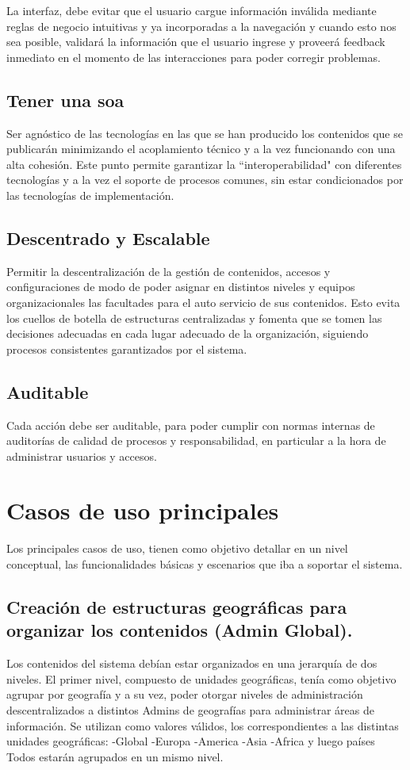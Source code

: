 La interfaz, debe evitar que el usuario cargue información inválida mediante reglas de negocio intuitivas y ya incorporadas a la navegación y cuando esto nos sea posible, validará la información que el usuario ingrese y proveerá feedback inmediato en el momento de las interacciones para poder corregir problemas.

\subsection{Tener una \Gls{soa}}
\label{principios:soa}
Ser agnóstico de las tecnologías en las que se han producido los contenidos que se publicarán minimizando el acoplamiento técnico y a la vez funcionando con una alta cohesión. Este punto permite garantizar la “interoperabilidad" con diferentes tecnologías y a la vez el soporte de procesos comunes, sin estar condicionados por las tecnologías de implementación.

\subsection{Descentrado y Escalable}
\label{principios:federado}
Permitir la descentralización de la gestión de contenidos, accesos y configuraciones de modo de poder asignar en distintos niveles y equipos organizacionales las facultades para el auto servicio de sus contenidos. Esto evita los cuellos de botella de estructuras centralizadas y fomenta que se tomen las decisiones adecuadas en cada lugar adecuado de la organización, siguiendo procesos consistentes garantizados por el sistema.

\subsection{Auditable}
\label{princpipios:auditable}
Cada acción debe ser auditable, para poder cumplir con normas internas de auditorías de calidad de procesos y responsabilidad, en particular a la hora de administrar usuarios y accesos.

\section{Casos de uso principales}
\label{usecases:main}
Los principales casos de uso, tienen como objetivo detallar en un nivel conceptual, las funcionalidades básicas y escenarios que iba a soportar el sistema. 

\subsection{Creación de estructuras geográficas para organizar los contenidos (Admin Global).}
\label{usecases:geolevel1}
Los contenidos del sistema debían estar organizados en una jerarquía de dos niveles. El primer nivel, compuesto de unidades geográficas, tenía como objetivo agrupar por geografía y a su vez, poder otorgar niveles de administración descentralizados a distintos Admins de geografías para administrar áreas de información. Se utilizan como valores válidos, los correspondientes a las distintas unidades geográficas:
	-Global
	-Europa
	-America
	-Asia
	-Africa
	y luego países
   	Todos estarán agrupados en un mismo nivel.

